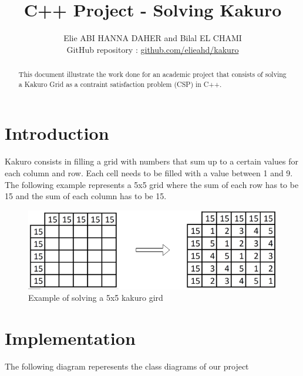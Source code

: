 \documentclass[journal, a4paper]{IEEEtran}
\begin{document}
\title{C++ Project - Solving Kakuro}
\author{
	Elie ABI HANNA DAHER and Bilal EL CHAMI \\ 
	GitHub repository : \href{https://github.com/elieahd/kakuro}{github.com/elieahd/kakuro}
}
\maketitle

\begin{abstract}
	This document illustrate the work done for an academic project that consists of solving a Kakuro Grid as a contraint satisfaction problem (CSP) in C++.
\end{abstract}

\section{Introduction}
 Kakuro consists in filling a grid with numbers that sum up to a certain values for each column and row. Each cell needs to be filled with a value between 1 and 9.\\
 The following example represents a 5x5 grid where the sum of each row has to be 15 and the sum of each column has to be 15.
\begin{figure}[h!]
    	 \begin{center}
		\includegraphics[width=\columnwidth]{example_kakuro.png}
  		\caption{Example of solving a 5x5 kakuro gird}
		\label{fig:example_kakuro}
    	 \end{center}
\end{figure}

\section{Implementation}
The following diagram reperesents the class diagrams of our project\\
\end{document}
